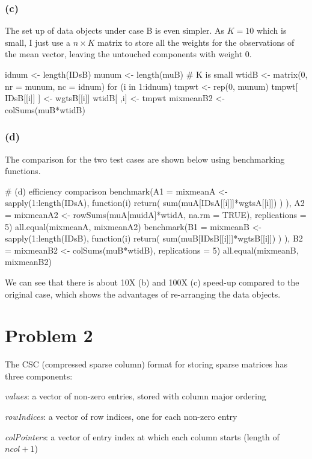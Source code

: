 \documentclass{article}
\begin{document}
\subsubsection*{(c)}
The set up of data objects under case B is even simpler. As $K=10$ which is small, I just use a $n \times K$ matrix to
store all the weights for the observations of the mean vector, leaving the untouched components with weight 0.

idnum <- length(IDsB)
munum <- length(muB) # K is small
wtidB <- matrix(0, nr = munum, nc = idnum)
for (i in 1:idnum) {
	tmpwt <- rep(0, munum)
	tmpwt[ IDsB[[i]] ] <- wgtsB[[i]]
	wtidB[ ,i] <- tmpwt
}
mixmeanB2 <- colSums(muB*wtidB)

\subsubsection*{(d)}
The comparison for the two test cases are shown below using benchmarking functions.

# (d) efficiency comparison
benchmark(A1 = {mixmeanA <- sapply(1:length(IDsA), 
                            function(i){ return( sum(muA[IDsA[[i]]]*wgtsA[[i]]) ) })},
          A2 = {mixmeanA2 <- rowSums(muA[muidA]*wtidA, na.rm = TRUE)}, 
          replications = 5)
all.equal(mixmeanA, mixmeanA2)
benchmark(B1 = {mixmeanB <- sapply(1:length(IDsB), 
                            function(i){ return( sum(muB[IDsB[[i]]]*wgtsB[[i]]) ) })},
          B2 = {mixmeanB2 <- colSums(muB*wtidB)}, 
          replications = 5)
all.equal(mixmeanB, mixmeanB2)

We can see that there is about 10X (b) and 100X (c) speed-up compared to the original case, which shows the 
advantages of re-arranging the data objects.

\newpage
\section*{Problem 2}
The CSC (compressed sparse column) format for storing sparse matrices has three components:
\small
\begin{description}
\item \textit{values}: a vector of non-zero entries, stored with column major ordering
\item \textit{rowIndices}: a vector of row indices, one for each non-zero entry
\item \textit{colPointers}: a vector of entry index at which each column starts (length of $ncol + 1$)
\end{description}
\normalsize
\end{document}
